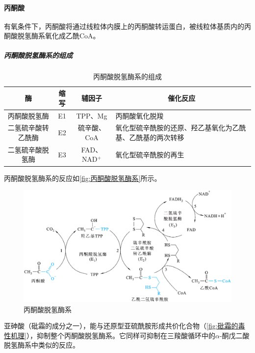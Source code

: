 \paragraph{丙酮酸}

有氧条件下，丙酮酸将通过线粒体内膜上的丙酮酸转运蛋白，被线粒体基质内的丙酮酸脱氢酶系氧化成乙酰CoA。

\subparagraph{丙酮酸脱氢酶系的组成}

\begin{table}[htbp]
	\centering
	\begin{tabularx}{\textwidth}{|c|c|c|X|}
		\hline
		\textbf{酶} & \textbf{缩写} & \textbf{辅因子} & \multicolumn{1}{c|}{\textbf{催化反应}} \\ \hline
		丙酮酸脱氢酶 & E1 & TPP、Mg & 丙酮酸氧化脱羧 \\ \hline
		二氢硫辛酸转乙酰酶 & E2 & 硫辛酸、CoA & 氧化型硫辛酰胺的还原、羟乙基氧化为乙酰基、乙酰基的两次转移 \\ \hline
		二氢硫辛酸脱氢酶 & E3 & FAD、NAD$^{+}$ & 氧化型硫辛酰胺的再生 \\ \hline
	\end{tabularx}
	\caption{丙酮酸脱氢酶系的组成}
	\label{tab:丙酮酸脱氢酶系的组成}
\end{table}

丙酮酸脱氢酶系的反应如\autoref{fig:丙酮酸脱氢酶系}所示。

\begin{figure}[htbp]
	\centering
	\includegraphics[width=\textwidth]{Pics/丙酮酸脱氢酶系}
	\caption{丙酮酸脱氢酶系}
	\label{fig:丙酮酸脱氢酶系}
\end{figure}

亚砷酸（砒霜的成分之一），能与还原型亚硫酰胺形成共价化合物（\autoref{fig:砒霜的毒性机理}），抑制整个丙酮酸脱氢酶系。它同样可抑制在三羧酸循环中的$\alpha$-酮戊二酸脱氢酶系中类似的反应。

